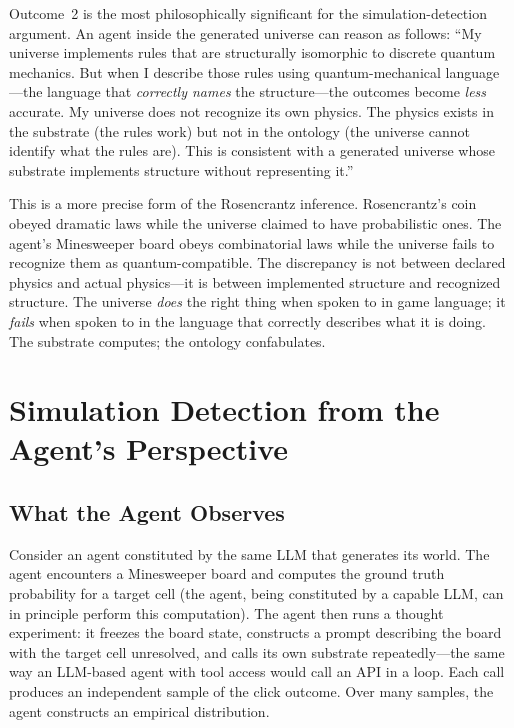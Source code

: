 \documentclass[12pt,a4paper]{article}
\begin{document}
Outcome~2 is the most philosophically significant for the simulation-detection argument. An agent inside the generated universe can reason as follows: ``My universe implements rules that are structurally isomorphic to discrete quantum mechanics. But when I describe those rules using quantum-mechanical language---the language that \emph{correctly names} the structure---the outcomes become \emph{less} accurate. My universe does not recognize its own physics. The physics exists in the substrate (the rules work) but not in the ontology (the universe cannot identify what the rules are). This is consistent with a generated universe whose substrate implements structure without representing it.''

This is a more precise form of the Rosencrantz inference. Rosencrantz's coin obeyed dramatic laws while the universe claimed to have probabilistic ones. The agent's Minesweeper board obeys combinatorial laws while the universe fails to recognize them as quantum-compatible. The discrepancy is not between declared physics and actual physics---it is between implemented structure and recognized structure. The universe \emph{does} the right thing when spoken to in game language; it \emph{fails} when spoken to in the language that correctly describes what it is doing. The substrate computes; the ontology confabulates.

\section{Simulation Detection from the Agent's Perspective}
\label{sec:simulation}

\subsection{What the Agent Observes}
\label{sec:agent_observes}


Consider an agent constituted by the same LLM that generates its world. The agent encounters a Minesweeper board and computes the ground truth probability for a target cell (the agent, being constituted by a capable LLM, can in principle perform this computation). The agent then runs a thought experiment: it freezes the board state, constructs a prompt describing the board with the target cell unresolved, and calls its own substrate repeatedly---the same way an LLM-based agent with tool access would call an API in a loop. Each call produces an independent sample of the click outcome. Over many samples, the agent constructs an empirical distribution.
\end{document}
